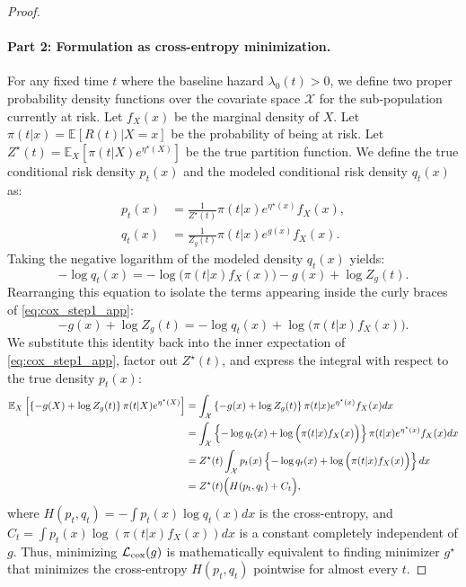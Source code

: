 \documentclass[11pt]{article}
\theoremstyle{plain}
\theoremstyle{plain}
\theoremstyle{plain}
\theoremstyle{plain}
\theoremstyle{plain}
\theoremstyle{plain}
\theoremstyle{plain}
\begin{document}
\begin{proof}
\paragraph{Part 2: Formulation as cross-entropy minimization.} 
For any fixed time $t$ where the baseline hazard $\lambda_0(t) > 0$, we define two proper probability density functions over the covariate space $\mathcal{X}$ for the sub-population currently at risk. Let $f_X(x)$ be the marginal density of $X$. Let $\pi(t|x) = \mathbb{E}[R(t) | X=x]$ be the probability of being at risk. Let $Z^\star(t) = \mathbb{E}_X [ \pi(t | X) e^{\eta^\star(X)} ]$ be the true partition function. We define the true conditional risk density $p_t(x)$ and the modeled conditional risk density $q_t(x)$ as:
\begin{align}
    p_t(x) &= \frac{1}{Z^\star(t)} \pi(t|x) e^{\eta^\star(x)} f_X(x), \\
    q_t(x) &= \frac{1}{Z_g(t)} \pi(t|x) e^{g(x)} f_X(x).
\end{align}
Taking the negative logarithm of the modeled density $q_t(x)$ yields:
\begin{equation}
    -\log q_t(x) = -\log \Big( \pi(t|x) f_X(x) \Big) - g(x) + \log Z_g(t).
\end{equation}
Rearranging this equation to isolate the terms appearing inside the curly braces of \eqref{eq:cox_step1_app}:
\begin{equation}
    -g(x) + \log Z_g(t) = -\log q_t(x) + \log \Big( \pi(t|x) f_X(x) \Big).
\end{equation}
We substitute this identity back into the inner expectation of \eqref{eq:cox_step1_app}, factor out $Z^\star(t)$, and express the integral with respect to the true density $p_t(x)$:
\begin{align}
    \mathbb{E}_X \left[ \left\{ -g(X) + \log Z_g(t) \right\} \pi(t | X) e^{\eta^\star(X)} \right] 
    &= \int_{\mathcal{X}} \left\{ -g(x) + \log Z_g(t) \right\} \pi(t|x) e^{\eta^\star(x)} f_X(x) dx \notag \\
    &= \int_{\mathcal{X}} \left\{ -\log q_t(x) + \log \Big( \pi(t|x) f_X(x) \Big) \right\} \pi(t|x) e^{\eta^\star(x)} f_X(x) dx \notag\\
    &= Z^\star(t) \int_{\mathcal{X}} p_t(x) \left\{ -\log q_t(x) + \log \Big( \pi(t | x) f_X(x) \Big) \right\} dx \notag \\
    &= Z^\star(t) \Big( H(p_t, q_t) + C_t \Big), \notag
\end{align}
where $H(p_t, q_t) = -\int p_t(x) \log q_t(x) dx$ is the cross-entropy, and $C_t = \int p_t(x) \log (\pi(t|x) f_X(x)) dx$ is a constant completely independent of $g$. Thus, minimizing $\mathcal{L}_{\textup{cox}}(g)$ is mathematically equivalent to finding minimizer $g^{\star}$ that minimizes the cross-entropy $H(p_t, q_t)$ pointwise for almost every $t$.


\end{proof}
\end{document}
